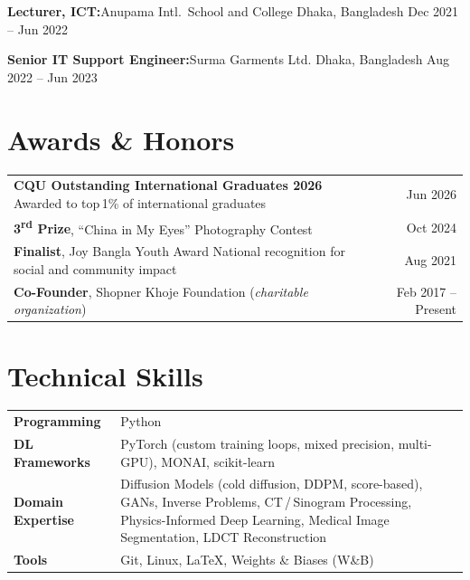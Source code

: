 \documentclass[11pt,a4paper]{article}
\begin{document}
\textbf{Lecturer, ICT:}\enspace Anupama Intl.\ School and College \hfill Dhaka, Bangladesh \enspace\textbar\enspace Dec 2021 -- Jun 2022

\vspace{3pt}

\textbf{Senior IT Support Engineer:}\enspace Surma Garments Ltd. \hfill Dhaka, Bangladesh \enspace\textbar\enspace Aug 2022 -- Jun 2023

\section*{Awards \& Honors}

\begin{tabularx}{\textwidth}{@{}X r@{}}
  \textbf{CQU Outstanding International Graduates 2026}
    {\;\small\color{SoftGray}Awarded to top\,1\% of international graduates}
    & Jun 2026 \\[2pt]
  \textbf{3\textsuperscript{rd} Prize}, ``China in My Eyes'' Photography Contest
    & Oct 2024 \\[2pt]
  \textbf{Finalist}, Joy Bangla Youth Award
    {\;\small\color{SoftGray}National recognition for social and community impact}
    & Aug 2021 \\[2pt]
  \textbf{Co-Founder}, Shopner Khoje Foundation (\textit{charitable organization})
    & Feb 2017 -- Present \\
\end{tabularx}

\section*{Technical Skills}

\begin{tabularx}{\textwidth}{@{}l X@{}}
  \textbf{Programming}      & Python \\[2pt]
  \textbf{DL Frameworks}    & PyTorch (custom training loops, mixed precision, multi-GPU),
                               MONAI, scikit-learn \\[2pt]
  \textbf{Domain Expertise} & Diffusion Models (cold diffusion, DDPM, score-based),
                               GANs, Inverse Problems, CT\,/\,Sinogram Processing,
                               Physics-Informed Deep Learning, Medical Image Segmentation,
                               LDCT Reconstruction \\[2pt]
  \textbf{Tools}            & Git, Linux, \LaTeX, Weights \& Biases (W\&B) \\
\end{tabularx}
\end{document}
